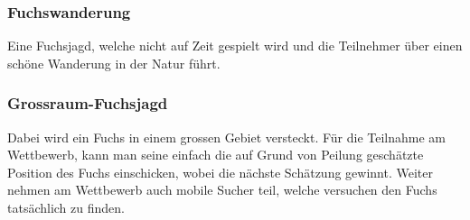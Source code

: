 \subsubsection{Fuchswanderung} %
\label{ssub:Fuchswanderung}
Eine Fuchsjagd, welche nicht auf Zeit gespielt wird und die Teilnehmer über einen schöne Wanderung in der Natur führt.

\subsubsection{Grossraum-Fuchsjagd} %
\label{ssub:Grossraum-Fuchsjagd}
Dabei wird ein Fuchs in einem grossen Gebiet versteckt. Für die Teilnahme am Wettbewerb, kann man seine einfach die auf Grund von Peilung geschätzte Position des Fuchs einschicken, wobei die nächste Schätzung gewinnt. Weiter nehmen am Wettbewerb auch mobile Sucher teil, welche versuchen den Fuchs tatsächlich zu finden.

